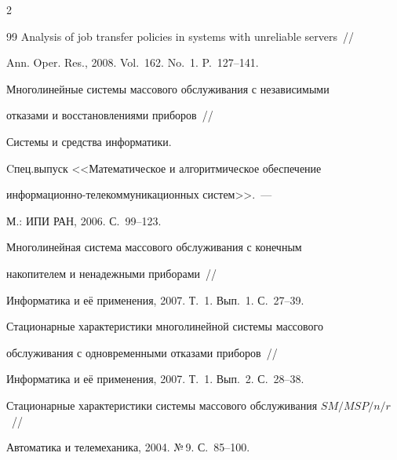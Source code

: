 \begin{multicols}{2}
{{\begin{thebibliography}{99}
Analysis of job transfer policies in systems with unreliable servers~//


Ann. Oper. Res., 2008. Vol.~162. No.~1. P.~127--141.









Многолинейные системы массового обслуживания с независимыми


отказами и восстановлениями приборов~//


Системы и средства информатики.


Cпец.\linebreak выпуск <<Математическое и алгоритмическое обеспечение


информационно-телекоммуникационных сис\-тем>>.~---


М.: ИПИ РАН, 2006. С.~99--123.









Многолинейная система массового обслуживания с конечным


накопителем и ненадежными приборами~//


Информатика и её применения, 2007. Т.~1. Вып.~1. С.~27--39.









Стационарные характеристики многолинейной системы массового


обслуживания с одновременными отказами приборов~//


Информатика и её применения, 2007. Т.~1. Вып.~2. С.~28--38.









Стационарные характеристики системы массового обслуживания $SM/MSP/n/r$~//


Автоматика и телемеханика, 2004. №\,9. С.~85--100.








\end{thebibliography}}}
\end{multicols}
